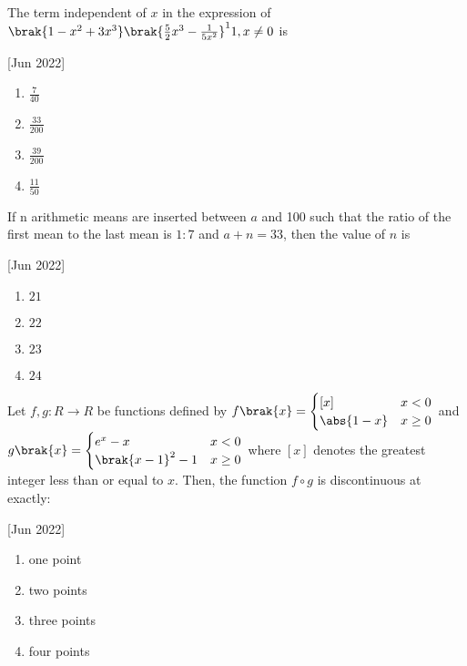     \item The term independent of $x$ in the expression of $\brak{1-x^2+3x^3}\brak{\frac{5}{2}x^3-\frac{1}{5x^2}}^11,x\neq 0$ is
    
    \hfill[Jun 2022]

		\begin{multicols}{4}
			\begin{enumerate}
				\item $\frac{7}{40}$
				\item $\frac{33}{200}$
				\item $\frac{39}{200}$
				\item $\frac{11}{50}$
			\end{enumerate}
		\end{multicols}

    \item If n arithmetic means are inserted between $a$ and 100 such that the ratio of the first mean to the last mean is $1:7$ and $a+n=33$, then the value of $n$ is
    
    \hfill[Jun 2022]

		\begin{multicols}{4}
			\begin{enumerate}
				\item $21$
				\item $22$
				\item $23$
				\item $24$
			\end{enumerate}
		\end{multicols}
  
    \item Let $f,g:R\to R$ be functions defined by
        $f\brak{x}=
        \begin{cases}
        \left[x\right] & x<0\\
        \abs{1-x} & x\geq 0
        \end{cases}
        $ and 
        $g\brak{x}=
        \begin{cases}
        e^x-x & x<0\\
        \brak{x-1}^2-1 & x\geq0
        \end{cases}
        $ where $\left[x\right]$ denotes the greatest integer less than or equal to $x$. Then, the function $f\circ g$ is discontinuous at exactly:
    
    \hfill[Jun 2022]

        \begin{multicols}{4}
            \begin{enumerate}
                \item one point
                \item two points
                \item three points
                \item four points
            \end{enumerate}
        \end{multicols}

